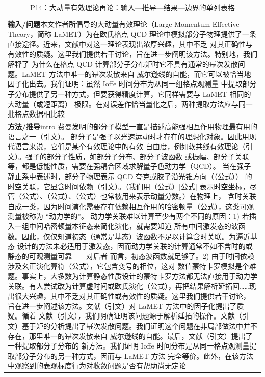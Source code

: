 \documentclass[UTF8,11pt,oneside]{ctexbook}
\begin{document}
\begin{table}[htbp]
  \centering
  \caption*{P14：大动量有效理论再论：输入—推导—结果—边界的单列表格}
  \small
  \begin{tabular}{@{}p{}@{}}
    \toprule
    \textbf{输入/问题}\quad 本文作者所倡导的大动量有效理论（Large-Momentum Effective Theory，简称 LaMET）为在欧氏格点 QCD 理论中模拟部分子物理提供了一条直接途径。近来，文献中对这一理论表现出浓厚兴趣，其中不乏 对其正确性与有效性的质疑。这里我们提供若干讨论，旨在进一步阐明该方法。特别地，我们解释了 为什么在格点 QCD 计算部分子分布矩时它不具有通常的幂次发散问题。LaMET 方法中唯一的幂次发散来自 威尔逊线的自能，而它可以被恰当地因子化出去。我们证明：虽然 Ioffe 时间分布为从同一组格点观测量 中提取部分子分布提供了另一种方式，但要获得精度计算，它同样需要与 LaMET 相同的大动量（或短距离） 极限。在对误差作恰当量化之后，两种提取方法应与同一批格点数据相比较 \\
    \textbf{方法/推导}\quad intro 费曼发明的部分子模型一直是描述高能强相互作用物理最有用的语言之一（引文）。 部分子是强子以光速运动时才存在的理想化对象。因此用现代语言来说，它们是某个有效理论中的有效 自由度，例如软共线有效理论（引文）。强子的部分子性质，如部分子分布、部分子波函数 或振幅、部分子关联等，都是低能性质，需要在强耦合区域求解量子色动力学（QCD）。 当在强子静止系中表述时，部分子物理表示 QCD 夸克或胶子沿光锥方向（（公式）） 的时空关联，它显含时间依赖（引文）。（我们用（公式）[公式] 表示时空坐标，尽管（公式）、（公式）、（公式）也常被用来表示动量分数。）在物理上， 含时关联自成一类，因为时间演化需要存在依赖相互作用的哈密顿量（公式），这类可观测量被称为 ``动力学的''。 动力学关联难以计算至少有两个不同的原因：1) 若插入一组中间哈密顿量本征态来简化演化，就需要知道 所有中间激发态的波函数。因此，仅仅知道初态（通常是基态）波函数不足以计算含时关联。为逼近基态 设计的方法未必适用于激发态，因而动力学关联的计算通常不如不含时的或静态的可观测量可靠——对后者 而言，初态波函数就足够了。2) 由于时间依赖涉及幺正演化算符（公式），它包含变号的相位，这对 数值蒙特卡罗模拟是个难题。事实上，大多数为计算静态性质设计的蒙特卡罗方法都无法直接用于动力学 关联。有人尝试改为计算虚时间或欧氏演化（公式），再把结果解析延拓回……现出很大兴趣，其中不乏对其正确性或有效性的质疑。这里我们提供若干讨论， 旨在进一步阐述该方法。文献（引文）对 LaMET 方法中的因子化提出了质疑。循着 文献（引文），我们明确证明该问题源于解析延拓的操作。文献（引文）基于矩的分析提出了幂次发散问题。我们证明这个问题在非局部做法中并不存在，那里唯一的幂次发散来自 威尔逊线的自能。最后，文献（引文）提出了一种提取部分子分布的 新方法。我们证明 Ioffe 时间分布是从同一格点观测量提取部分子分布的另一种方式，因而与 LaMET 方法 完全等价。此外，在该方法中观察到的表观标度行为对收敛问题是否有帮助尚无定论 \\

\end{tabular}
\end{table}
\end{document}

